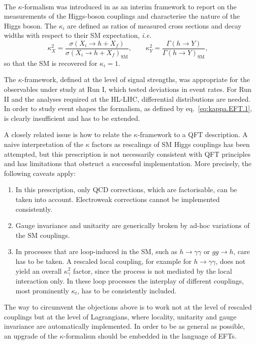 \\
The $\kappa$-formalism was introduced in\cite{LHCHiggsCrossSectionWorkingGroup:2012nn,Heinemeyer:2013tqa} as an interim framework to report on the measurements of the Higgs-boson couplings and characterise the nature of the Higgs boson. The $\kappa_{i}$ are defined as ratios of measured cross sections and decay widths with respect to their SM expectation, {\it i.e.}
\begin{equation}
  \label{eq:kappa.EFT.1}
  \kappa^{2}_{X} = \frac{\sigma(X_i\rightarrow h+X_f)}{\sigma(X_i\rightarrow h+X_f)_{\text{SM}}}, \qquad \kappa^{2}_{Y} = \frac{\Gamma(h\rightarrow Y)}{\Gamma(h\rightarrow Y)_{\text{SM}}},
\end{equation}
so that the SM is recovered for $\kappa_i=1$.

The $\kappa$-framework, defined at the level of signal strengths, was appropriate for the observables under study at Run I, which tested deviations in event rates. For Run II and the analyses required at the HL-LHC, differential distributions are needed. In order to study event shapes the formalism, as defined by eq.~\eqref{eq:kappa.EFT.1}, is clearly insufficient and has to be extended.

A closely related issue is how to relate the $\kappa$-framework to a QFT description. A naive interpretation of the $\kappa$ factors as rescalings of SM Higgs couplings has been attempted, but this prescription is not necessarily consistent with QFT principles and has limitations that obstruct a successful implementation. More precisely, the following caveats apply:
\begin{enumerate}
\item In this prescription, only QCD corrections, which are factorisable, can be taken into account. Electroweak corrections cannot be implemented consistently.
\item Gauge invariance and unitarity are generically broken by ad-hoc variations of the SM couplings.
\item  In processes that are loop-induced in the SM, such as $h\to \gamma\gamma$ or $gg\to h$, care has to be taken. A rescaled local coupling, for example for $h\to \gamma\gamma$, does not yield an overall $\kappa_{\gamma}^2$ factor, since the process is not mediated by the local interaction only. In these loop processes the interplay of different couplings, most prominently $\kappa_t$, has to be consistently included.        
\end{enumerate}
The way to circumvent the objections above is to work not at the level of rescaled couplings but at the level of Lagrangians, where locality, unitarity and gauge invariance are automatically implemented. In order to be as general as possible, an upgrade of the $\kappa$-formalism should be embedded in the language of EFTs.

